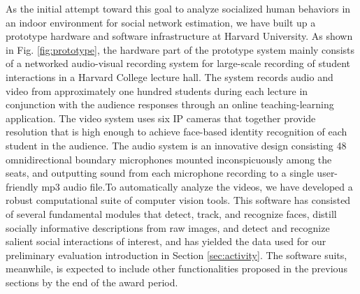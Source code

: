 As the initial attempt toward this goal to analyze socialized human behaviors in an indoor environment for social network estimation, we have built up a prototype hardware and software infrastructure at Harvard University. As shown in Fig. \ref{fig:prototype}, the hardware part of the prototype system mainly consists of a networked audio-visual recording system for large-scale recording of student interactions in a Harvard College lecture hall. The system records audio and video from approximately one hundred students during each lecture in conjunction with the audience responses through an online teaching-learning application. The video system uses six IP cameras that together provide resolution that is high enough to achieve face-based identity recognition of each student in the audience. The audio system is an innovative design consisting 48 omnidirectional boundary microphones mounted inconspicuously among the seats, and outputting sound from each microphone recording to a single user-friendly mp3 audio file.To automatically analyze the videos, we have developed a robust computational suite of computer vision tools. This software has consisted of several fundamental modules that detect, track, and recognize faces,  distill socially informative descriptions from raw images, and detect and recognize salient social interactions of interest, and has yielded the data used for our preliminary evaluation introduction in Section \ref{sec:activity}. The software suits, meanwhile, is expected to include other functionalities proposed in the previous sections by the end of the award period.

